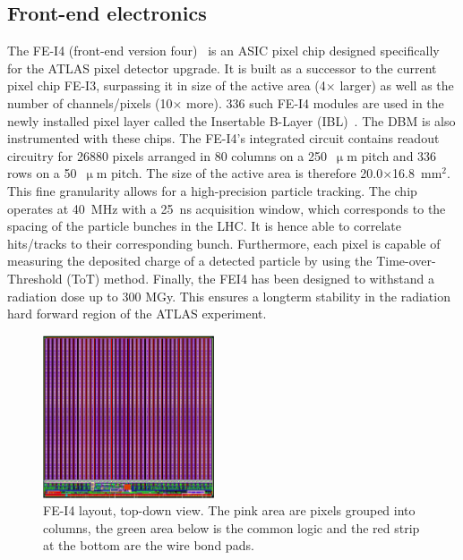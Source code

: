 \subsection{Front-end electronics}
The FE-I4 (front-end version four)~\cite{} is an ASIC pixel chip designed specifically for the ATLAS pixel detector upgrade. It is built as a successor to the current pixel chip FE-I3, surpassing it in size of the active area (4$\times$ larger) as well as the number of channels/pixels (10$\times$ more). 336 such FE-I4 modules are used in the newly installed pixel layer called the Insertable B-Layer (IBL)~\cite{}. The DBM is also instrumented with these chips. The FE-I4's integrated circuit contains readout circuitry for 26880 pixels arranged in 80 columns on a 250~$\upmu$m pitch and 336 rows on a 50~$\upmu$m pitch. The size of the active area is therefore 20.0$\times$16.8~mm$^2$. This fine granularity allows for a high-precision particle tracking. The chip operates at 40~MHz with a 25~ns acquisition window, which corresponds to the spacing of the particle bunches in the LHC. It is hence able to correlate hits/tracks to their corresponding bunch. Furthermore, each pixel is capable of measuring the deposited charge of a detected particle by using the Time-over-Threshold (ToT) method. Finally, the FEI4 has been designed to withstand a radiation dose up to 300 MGy. This ensures a longterm stability in the radiation hard forward region of the ATLAS experiment.

\begin{figure}[!t]
\centering
\includegraphics[width=0.45\textwidth]{04_charge_monitoring/pics/fei41}
\caption{FE-I4 layout, top-down view. The pink area are pixels grouped into columns, the green area below is the common logic and the red strip at the bottom are the wire bond pads.}
\label{fig:anapix}
\end{figure}

